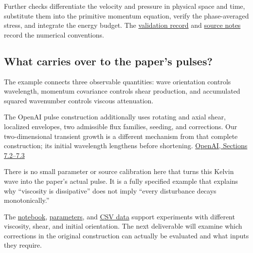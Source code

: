 \documentclass[
  english,
  11pt,
]{article}
\begin{document}
Further checks differentiate the velocity and pressure in physical space
and time, substitute them into the primitive momentum equation, verify
the phase-averaged stress, and integrate the energy budget. The
\href{../../code/d5_shearing_wave/validation.json}{validation record}
and \href{source-notes.md}{source notes} record the numerical
conventions.

\subsection{What carries over to the paper's
pulses?}\label{what-carries-over-to-the-papers-pulses}

The example connects three observable quantities: wave orientation
controls wavelength, momentum covariance controls shear production, and
accumulated squared wavenumber controls viscous attenuation.

The OpenAI pulse construction additionally uses rotating and axial
shear, localized envelopes, two admissible flux families, seeding, and
corrections. Our two-dimensional transient growth is a different
mechanism from that complete construction; its initial wavelength
lengthens before shortening.
\href{https://cdn.openai.com/pdf/32d9f210-8b73-45e0-91bc-82a30aef8a9a/navier-stokes.pdf}{OpenAI,
Sections 7.2--7.3}

There is no small parameter or source calibration here that turns this
Kelvin wave into the paper's actual pulse. It is a fully specified
example that explains why ``viscosity is dissipative'' does not imply
``every disturbance decays monotonically.''

The \href{../../code/d5_shearing_wave/study.ipynb}{notebook},
\href{../../code/d5_shearing_wave/parameters.json}{parameters}, and
\href{../../code/d5_shearing_wave/data/}{CSV data} support experiments
with different viscosity, shear, and initial orientation. The next
deliverable will examine which corrections in the original construction
can actually be evaluated and what inputs they require.
\end{document}
